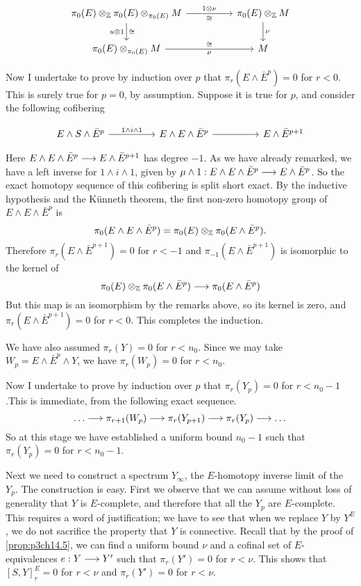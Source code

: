 \documentclass[../main]{subfiles}
\begin{document}
$$\begin{tikzcd}
	{\pi_0(E)\otimes_\mathbb{Z}\pi_0(E)\otimes_{\pi_0(E)}M} \arrow[swap]{rr}{\cong}[swap]{1\otimes \nu} \arrow[swap]{d}{u\otimes 1}[swap]{\cong}&& {\pi_0(E)\otimes_\mathbb{Z}M} \\
	{\pi_0(E)\otimes_{\pi_0(E)}M}\arrow[swap]{rr}{\nu}[swap]{\cong} && M
	\arrow["\nu", from=1-3, to=2-3]
\end{tikzcd}$$

Now I undertake to prove by induction over $p$ that $\pi_r(E\wedge \bar{E}^p) = 0$ for $r<0$. This is surely true for $p=0$, by assumption. Suppose it is true for $p$, and consider the following cofibering

$$\begin{tikzcd}
	{E\wedge S\wedge \bar{E}^p} && {E\wedge E\wedge\bar{E}^p} && {E\wedge\bar{E}^{p+1}}
	\arrow["{1\wedge i\wedge 1}", from=1-1, to=1-3]
	\arrow[from=1-3, to=1-5]
\end{tikzcd}$$

Here $E\wedge E\wedge\bar{E}^p\overset{}{\longrightarrow}{E\wedge\bar{E}^{p+1}} $ has degree $-1$. As we have already remarked, we have a left inverse for $1\wedge i\wedge 1$, given by $\mu \wedge 1:E\wedge E\wedge \bar{E}^p\overset{}{\longrightarrow}E\wedge\bar{E}^p  $. So the exact homotopy sequence of this cofibering is split short exact. By the inductive hypothesis and the K\"unneth
theorem, the first non-zero homotopy group of $E\wedge E\wedge\bar{E}^p$ is $$\pi_0(E\wedge E\wedge\bar{E}^p) = \pi_0(E) \otimes_{\mathbb{Z}} \pi_0(E\wedge \bar{E}^p).$$
Therefore $\pi_r(E\wedge \bar{E}^{p+1})=0$ for $r<-1$ and $\pi_{-1}(E\wedge \bar{E}^{p+1})$ is isomorphic to the kernel of $$\pi_0(E) \otimes_{\mathbb{Z}} \pi_0(E\wedge \bar{E}^p) \overset{}{\longrightarrow}\pi_0(E\wedge \bar{E}^p)$$ 
But this map is an isomorphism by the remarks above, so its kernel is
zero, and $\pi_{r}(E\wedge \bar{E}^{p+1})=0$ for $r<0$. This completes the induction.

We have also assumed $\pi_r(Y)=0$ for $r<n_0$. Since we may take $W_p=E\wedge \bar{E}^p\wedge Y$, we have $\pi_r(W_p)=0$ for $r<n_0$.

Now I undertake to prove by induction over $p$ that $\pi_r(Y_p)=0$ for $r<n_0-1$.This is immediate, from the following exact sequence. $$\dots \overset{}{\longrightarrow}\pi_{r+1}(W_p)\overset{}{\longrightarrow} \pi_r(Y_{p+1}) \overset{}{\longrightarrow} \pi_r(Y_p)\overset{}{\longrightarrow} \dots $$
So at this stage we have established a uniform bound $n_0-1$ such that $\pi_r(Y_p)=0$ for $r<n_0-1$.

Next we need to construct a spectrum $Y_\infty$, the $E$-homotopy inverse 
limit of the $Y_p$. The construction is easy. First we observe that we
can assume without loss of generality that $Y$ is $E$-complete, and therefore that all the $Y_p$ are $E$-complete. This requires a word of
justification; we have to see that when we replace $Y$ by $Y^E$, we do not
sacrifice the property that $Y$ is connective. Recall that by the proof of \ref{prop:p3ch14.5}, we can find a uniform bound $\nu$ and a cofinal set of
$E$-equivalences $e: Y\overset{}{\longrightarrow} Y'$ such that $\pi_r (Y')=0$ for $r<\nu$. This
shows that $[S,Y]^E_r=0$ for $r<\nu$ and $\pi_r(Y')=0$ for $r<\nu$.
\end{document}
